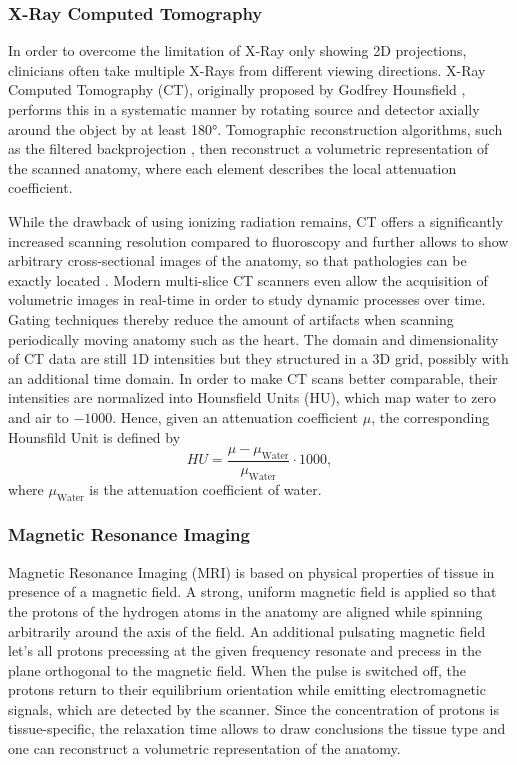 \subsubsection{X-Ray Computed Tomography}
In order to overcome the limitation of X-Ray only showing 2D projections, clinicians often take multiple X-Rays from different viewing directions.
X-Ray Computed Tomography (CT), originally proposed by Godfrey Hounsfield \cite{Hounsfield:1973:ComputedTomography}, performs this in a systematic manner by rotating source and detector axially around the object by at least 180°.
Tomographic reconstruction algorithms, such as the filtered backprojection \CN, then reconstruct a volumetric representation of the scanned anatomy, where each element describes the local attenuation coefficient.

While the drawback of using ionizing radiation remains, CT offers a significantly increased scanning resolution compared to fluoroscopy and further allows to show arbitrary cross-sectional images of the anatomy, so that pathologies can be exactly located \II.
Modern multi-slice CT scanners even allow the acquisition of volumetric images in real-time in order to study dynamic processes over time.
Gating techniques thereby reduce the amount of artifacts when scanning periodically moving anatomy such as the heart.
The domain and dimensionality of CT data are still 1D intensities but they structured in a 3D grid, possibly with an additional time domain.
In order to make CT scans better comparable, their intensities are normalized into Hounsfield Units (HU), which map water to zero and air to $-1000$.
Hence, given an attenuation coefficient $\mu$, the corresponding Hounsfild Unit is defined by
\begin{equation}
	\label{eq:background:HU}
	HU = \frac{\mu - \mu_{\text{Water}}}{\mu_{\text{Water}}} \cdot 1000,
\end{equation}
where $\mu_{\text{Water}}$ is the attenuation coefficient of water.



\subsubsection{Magnetic Resonance Imaging}
Magnetic Resonance Imaging (MRI) is based on physical properties of tissue in presence of a magnetic field.
A strong, uniform magnetic field is applied so that the protons of the hydrogen atoms in the anatomy are aligned while spinning arbitrarily around the axis of the field.
An additional pulsating magnetic field let's all protons precessing at the given frequency resonate and precess in the plane orthogonal to the magnetic field.
When the pulse is switched off, the protons return to their equilibrium orientation while emitting electromagnetic signals, which are detected by the scanner.
Since the concentration of protons is tissue-specific, the relaxation time allows to draw conclusions  the tissue type and one can reconstruct a volumetric representation of the anatomy.

